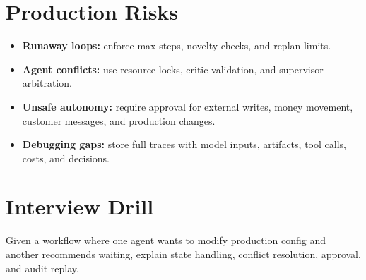 \section*{Production Risks}
\begin{itemize}
  \item \textbf{Runaway loops:} enforce max steps, novelty checks, and replan limits.
  \item \textbf{Agent conflicts:} use resource locks, critic validation, and supervisor arbitration.
  \item \textbf{Unsafe autonomy:} require approval for external writes, money movement, customer messages, and production changes.
  \item \textbf{Debugging gaps:} store full traces with model inputs, artifacts, tool calls, costs, and decisions.
\end{itemize}

\section*{Interview Drill}
Given a workflow where one agent wants to modify production config and another recommends waiting, explain state handling, conflict resolution, approval, and audit replay.

